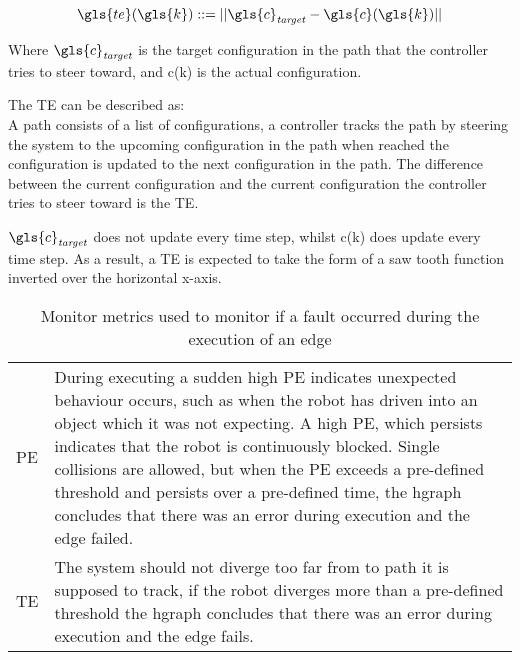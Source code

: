 \[ \gls{te}(\gls{k}) ::= ||\gls{c}_\mathit{target} - \gls{c}(\gls{k})|| \]

Where $\gls{c}_\mathit{target}$ is the target configuration in the path that the controller tries to steer toward, and \gls{c}(\gls{k}) is the actual configuration.\bs

The \ac{TE} can be described as:\\ A path consists of a list of configurations, a controller tracks the path by steering the system to the upcoming configuration in the path when reached the configuration is updated to the next configuration in the path. The difference between the current configuration and the current configuration the controller tries to steer toward is the \ac{TE}.\bs

$\gls{c}_\mathit{target}$ does not update every time step, whilst \gls{c}(\gls{k}) does update every time step. As a result, a  \ac{TE} is expected to take the form of a saw tooth function inverted over the horizontal x-axis.\bs

\begin{table}[htb!]
\centering
\begin{tabular}[t]{l p{10cm}}
  \acf{PE}&  During executing a sudden high \ac{PE} indicates unexpected behaviour occurs, such as when the robot has driven into an object which it was not expecting. A high \ac{PE}, which persists indicates that the robot is continuously blocked. Single collisions are allowed, but when the \ac{PE} exceeds a pre-defined threshold and persists over a pre-defined time, the \ac{hgraph} concludes that there was an error during execution and the edge failed.\\
  \acf{TE}& The system should not diverge too far from to path it is supposed to track, if the robot diverges more than a pre-defined threshold the \ac{hgraph} concludes that there was an error during execution and the edge fails. \\
\end{tabular}
\caption{Monitor metrics used to monitor if a fault occurred during the execution of an edge}%
\label{table:monitoring_edge_metrics}
\end{table}
